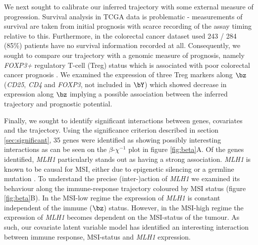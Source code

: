 We next sought to calibrate our inferred trajectory with some external measure of progression. Survival analysis in TCGA data is problematic - measurements of survival are taken from initial prognosis with scarce recording of the assay timing relative to this. Furthermore, in the colorectal cancer dataset used 243 / 284 (85\%) patients have no survival information recorded at all. Consequently, we sought to compare our trajectory with a genomic measure of prognosis, namely \emph{FOXP3+} regulatory T-cell (Treg) status which is associated with poor colorectal cancer prognosis \cite{shang2015prognostic}. We examined the expression of three Treg markers along $\bz$ (\emph{CD25}, \emph{CD4} and \emph{FOXP3}, not included in $\bY$) which showed decrease in expression along $\bz$ implying a possible association between the inferred trajectory and prognostic potential.

Finally, we sought to identify significant interactions between genes, covariates and the trajectory. Using the significance criterion described in section \ref{sec:significant}, 35 genes were identified as showing possibly interesting interactions as can be seen on the $\beta$-$\chi^{-1}$ plot in figure \ref{fig:beta}A. Of the genes identified, \emph{MLH1} particularly stands out as having a strong association. \emph{MLH1} is known to be causal for MSI, either due to epigenetic silencing or a germline mutation \cite{vilar2010microsatellite}. To understand the precise (inter-)action of \emph{MLH1} we examined its behaviour along the immune-response trajectory coloured by MSI status (figure \ref{fig:beta}B). In the MSI-low regime the expression of \emph{MLH1} is constant independent of the immune ($\bz$) status. However, in the MSI-high regime the expression of \emph{MLH1} becomes dependent on the MSI-status of the tumour. As such, our covariate latent variable model has identified an interesting interaction between immune response, MSI-status and \emph{MLH1} expression.




